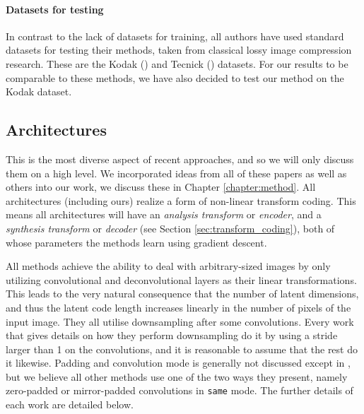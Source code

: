 \paragraph{Datasets for testing}
In contrast to the lack of datasets for training, all authors have used standard
datasets for testing their methods, taken from classical lossy image
compression research. These are the Kodak (\cite{kodakdataset}) and Tecnick
(\cite{asuni2014testimages}) datasets. For our results to be comparable
to these methods, we have also decided to test our method on the Kodak dataset.

\subsection{Architectures}
\par
This is the most diverse aspect of recent approaches, and so we will only
discuss them on a high level. We incorporated ideas from all of these papers
as well as others into our work, we discuss these in Chapter \ref{chapter:method}. All
architectures (including ours) realize a form of non-linear transform
coding. This means all architectures will have an \textit{analysis transform} or
\textit{encoder}, and a \textit{synthesis transform} or \textit{decoder} (see
Section \ref{sec:transform_coding}), both of whose parameters the methods learn
using gradient descent.
\par
All methods
achieve the ability to deal with arbitrary-sized images by only utilizing
convolutional and deconvolutional layers as their linear transformations. This
leads to the very natural consequence that the number of latent dimensions, and
thus the latent code length increases linearly in the number of pixels of the
input image. They all utilise downsampling after some convolutions.
Every work that gives details
on how they perform downsampling do it by using a stride larger than 1 on the
convolutions, and it is reasonable to assume that the rest do it likewise.
Padding and convolution mode is generally not discussed except in
\cite{theis2017lossy}, but we believe all other methods use one of the two ways
they present, namely zero-padded or mirror-padded convolutions in \texttt{same}
mode. The further details of each work are detailed below.

